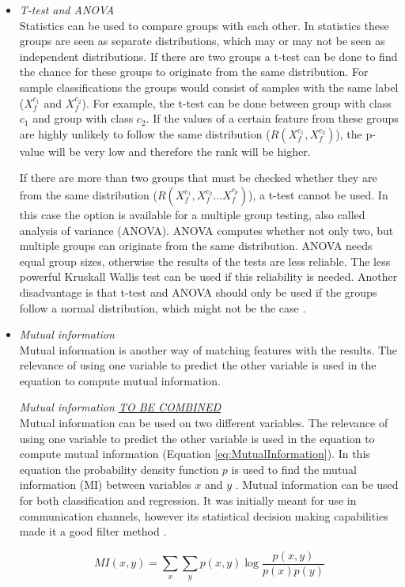 \documentclass[10pt,a4paper]{report}
\begin{document}
	\begin{itemize}
		\item \textit{T-test and ANOVA} \\ 
		Statistics can be used to compare groups with each other. In statistics these groups are seen as separate distributions, which may or may not be seen as independent distributions. If there are two groups  a t-test can be done to find the chance for these groups to originate from the same distribution\cite{heiberger2004statistical}. 
		For sample classifications the groups would consist of samples with the same label ($X_{f}^{c_1}$  and $X_{f}^{c_2}$). For example, the t-test can be done between group with class $c_1$ and group with class $c_2$. If the values of a certain feature from these groups are highly unlikely to follow the same distribution ($R(X_{f}^{c_1}, X_{f}^{c_2})$), the p-value will be very low and therefore the rank will be higher.
		
		If there are more than two groups that must be checked whether they are from the same distribution ($R(X_{f}^{c_1}, X_{f}^{c_2} ... X_{f}^{c_p})$), a t-test cannot be used. In this case the option is available for a multiple group testing, also called analysis of variance (ANOVA). ANOVA computes whether not only two, but multiple groups can originate from the same distribution. ANOVA needs equal group sizes, otherwise the results of the tests are less reliable. The less powerful Kruskall Wallis test can be used if this reliability is needed. Another disadvantage is that t-test and ANOVA should only be used if the groups follow a normal distribution, which might not be the case \cite{heiberger2004statistical}.
		
		\item \textit{Mutual information} \\
		Mutual information is another way of matching features with the results. The relevance of using one variable to predict the other variable is used in the equation to compute mutual information. 
		
		\textit{Mutual information \underline{TO BE COMBINED}} \\
		Mutual information can be used on two different variables. The relevance of using one variable to predict the other variable is used in the equation to compute mutual information (Equation \ref{eq:MutualInformation}). In this equation the probability density function $p$ is used to find the mutual information (MI) between variables $x$ and $y$ \cite{peng2005feature}. Mutual information can be used for both classification and regression. It was initially meant for use in communication channels, however its statistical decision making capabilities made it a good filter method \cite{battiti1994using}.
		
		\begin{equation}\label{eq:MutualInformation}
		MI(x, y) = \sum_x \sum_y p(x, y) \log{\frac{p(x, y)}{p(x)p(y)}}
		\end{equation}
		
	\end{itemize}
	
\end{document}
